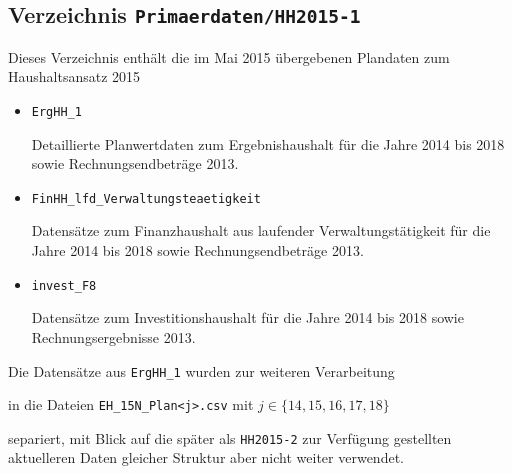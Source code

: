 \documentclass[a4paper,11pt,twoside]{article}
\begin{document}
\subsection{Verzeichnis \texttt{Primaerdaten/HH2015-1}}
Dieses Verzeichnis enthält die im Mai 2015 übergebenen Plandaten zum
Haushaltsansatz 2015
\begin{itemize}
\item \texttt{ErgHH\_1} 

Detaillierte Planwertdaten zum Ergebnishaushalt für die Jahre 2014 bis 2018
sowie Rechnungsendbeträge 2013.
\item \texttt{FinHH\_lfd\_Verwaltungsteaetigkeit} 

Datensätze zum Finanzhaushalt aus laufender Verwaltungstätigkeit für die Jahre
2014 bis 2018 sowie Rechnungsendbeträge 2013.
\item \texttt{invest\_F8} 

Datensätze zum Investitionshaushalt für die Jahre 2014 bis 2018 sowie
Rechnungsergebnisse 2013.
\end{itemize}
Die Datensätze aus \texttt{ErgHH\_1} wurden zur weiteren Verarbeitung 
\begin{center}
  in die Dateien \texttt{EH\_15N\_Plan<j>.csv} mit $j\in \{14,15,16,17,18\}$
\end{center}
separiert, mit Blick auf die später als \texttt{HH2015-2} zur Verfügung
gestellten aktuelleren Daten gleicher Struktur aber nicht weiter verwendet.
\end{document}
